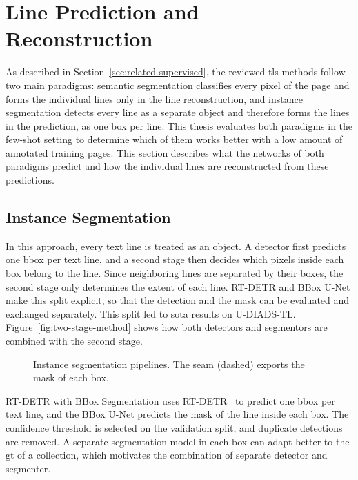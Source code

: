\FloatBarrier
\section{Line Prediction and Reconstruction}
\label{sec:pipelines}\label{sec:reconstruction}

As described in Section~\ref{sec:related-supervised}, the reviewed \gls{tls} methods follow two main paradigms: semantic segmentation classifies every pixel of the page and forms the individual lines only in the line reconstruction, and instance segmentation detects every line as a separate object and therefore forms the lines in the prediction, as one box per line. This thesis evaluates both paradigms in the few-shot setting to determine which of them works better with a low amount of annotated training pages. This section describes what the networks of both paradigms predict and how the individual lines are reconstructed from these predictions.

\subsection{Instance Segmentation}
\label{sec:meth-detection}

In this approach, every text line is treated as an object. A detector first predicts one \gls{bbox} per text line, and a second stage then decides which pixels inside each box belong to the line. Since neighboring lines are separated by their boxes,
the second stage only determines the extent of each line. RT-DETR and BBox U-Net make this split explicit, so that the detection and the mask can be evaluated and exchanged separately. This split led to \gls{sota} results on U-DIADS-TL. Figure~\ref{fig:two-stage-method} shows how both detectors and segmentors are combined with the second stage.

\begin{figure}[htbp]
    \centering
    
    \caption{Instance segmentation pipelines. The  seam (dashed) exports the mask of each box.}
    \label{fig:two-stage-method}\label{fig:mask-rcnn-architecture}
\end{figure}

RT-DETR with BBox Segmentation \label{sec:two-stage-method}\label{sec:crop-roi}\label{sec:crop-unet}\label{sec:integration}\label{sec:boundary-heads} uses RT-DETR~\cite{Zhao_2024_CVPR} to predict one \gls{bbox} per text line, and the BBox U-Net predicts the mask of the line inside each box. The confidence threshold is selected on the validation split, and duplicate detections are removed. A separate segmentation model in each box can adapt better to the \gls{gt} of a collection, which motivates the combination of separate detector and segmenter.

